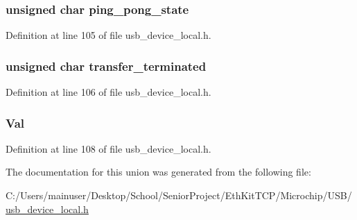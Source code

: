 \subsubsection[{ping\+\_\+pong\+\_\+state}]{\setlength{\rightskip}{0pt plus 5cm}unsigned char ping\+\_\+pong\+\_\+state}\label{union_e_p___s_t_a_t_u_s_af0b1bd7b5767b174b8f055d94cac4bcc}


Definition at line 105 of file usb\+\_\+device\+\_\+local.\+h.

\hypertarget{union_e_p___s_t_a_t_u_s_a4a20792b6382277d34763fd0157c9f2e}{}
\subsubsection[{transfer\+\_\+terminated}]{\setlength{\rightskip}{0pt plus 5cm}unsigned char transfer\+\_\+terminated}\label{union_e_p___s_t_a_t_u_s_a4a20792b6382277d34763fd0157c9f2e}


Definition at line 106 of file usb\+\_\+device\+\_\+local.\+h.

\hypertarget{union_e_p___s_t_a_t_u_s_a5ab8c2bf45b20b5f7aa3a4f083896cec}{}
\subsubsection[{Val}]{ Val}\label{union_e_p___s_t_a_t_u_s_a5ab8c2bf45b20b5f7aa3a4f083896cec}


Definition at line 108 of file usb\+\_\+device\+\_\+local.\+h.



The documentation for this union was generated from the following file\+:\begin{DoxyCompactItemize}
\item 
C\+:/\+Users/mainuser/\+Desktop/\+School/\+Senior\+Project/\+Eth\+Kit\+T\+C\+P/\+Microchip/\+U\+S\+B/\hyperlink{usb__device__local_8h}{usb\+\_\+device\+\_\+local.\+h}\end{DoxyCompactItemize}

